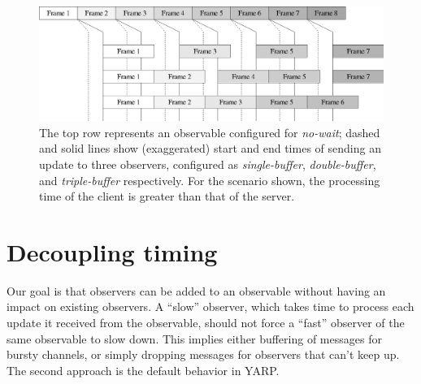 \begin{figure}[t]
\includegraphics[width=\columnwidth]{fig-throughput-nowait}
\caption{
The top row represents an observable configured for \textit{no-wait};
dashed and solid lines show (exaggerated) start and end times of 
sending an update to three observers, configured as
 \textit{single-buffer},
 \textit{double-buffer},
and \textit{triple-buffer}
respectively.  For the scenario shown, the processing time of the
client is greater than that of the server.
}
\label{fig:throughput-nowait}
\end{figure}



\section{Decoupling timing}

\label{sect:timing}

Our goal is that observers can be added to an observable without
having an impact on existing observers.  
%
A ``slow'' observer, which takes time to process each update it
received from the observable, should not force a ``fast'' observer of
the same observable to slow down.  This implies either buffering
of messages for bursty channels, or simply dropping messages for
observers that can't keep up.  The second approach is the default
behavior in YARP.

